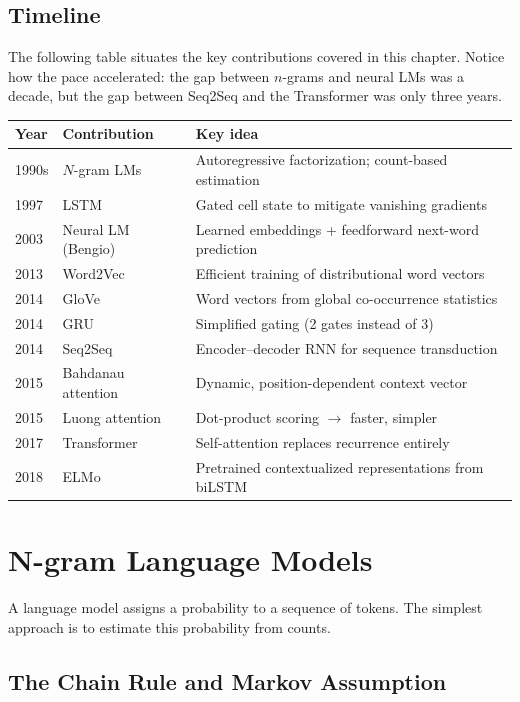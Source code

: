\subsection*{Timeline}

The following table situates the key contributions covered in this chapter. Notice how the pace accelerated: the gap between $n$-grams and neural LMs was a decade, but the gap between Seq2Seq and the Transformer was only three years.

\begin{center}
\begin{tabularx}{\textwidth}{@{}lp{3.8cm}X@{}}
\toprule
Year & Contribution & Key idea \\
\midrule
1990s & $N$-gram LMs & Autoregressive factorization; count-based estimation \\
1997 & LSTM & Gated cell state to mitigate vanishing gradients \\
2003 & Neural LM (Bengio) & Learned embeddings + feedforward next-word prediction \\
2013 & Word2Vec & Efficient training of distributional word vectors \\
2014 & GloVe & Word vectors from global co-occurrence statistics \\
2014 & GRU & Simplified gating (2 gates instead of 3) \\
2014 & Seq2Seq & Encoder--decoder RNN for sequence transduction \\
2015 & Bahdanau attention & Dynamic, position-dependent context vector \\
2015 & Luong attention & Dot-product scoring $\to$ faster, simpler \\
2017 & Transformer & Self-attention replaces recurrence entirely \\
2018 & ELMo & Pretrained contextualized representations from biLSTM \\
\bottomrule
\end{tabularx}
\end{center}

\section{N-gram Language Models}

A language model assigns a probability to a sequence of tokens. The simplest approach is to estimate this probability from counts.

\subsection{The Chain Rule and Markov Assumption}

